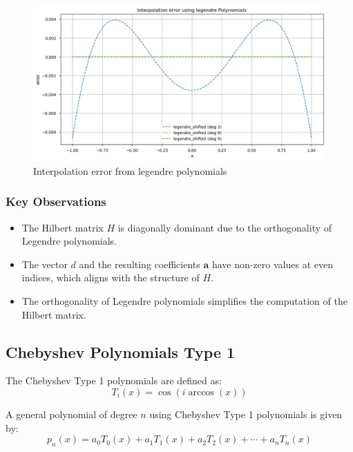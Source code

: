 \documentclass[10pt]{article}
\begin{document}
\begin{figure}[H]
    \centering
    \includegraphics[width=\imagewidth\textwidth]{figures/02_interpolation/interpolation_error_method_legendre_shifted.png}
    \caption{Interpolation error from legendre polynomials}
\end{figure}


\subsubsection{Key Observations}
\begin{itemize}
    \item The Hilbert matrix \( H \) is diagonally dominant due to the orthogonality of Legendre polynomials.
    \item The vector \( d \) and the resulting coefficients \( \mathbf{a} \) have non-zero values at even indices, which aligns with the structure of \( H \).
    \item The orthogonality of Legendre polynomials simplifies the computation of the Hilbert matrix.
\end{itemize}

\subsection{Chebyshev Polynomials Type 1}
The Chebyshev Type 1 polynomials are defined as:
\begin{equation}
T_i(x) = \cos(i \arccos(x))
\end{equation}

A general polynomial of degree $ n $ using Chebyshev Type 1 polynomials is given by:
\begin{equation}
p_n(x) = a_0 T_0(x) + a_1 T_1(x) + a_2 T_2(x) + \cdots + a_n T_n(x)
\end{equation}
\end{document}
